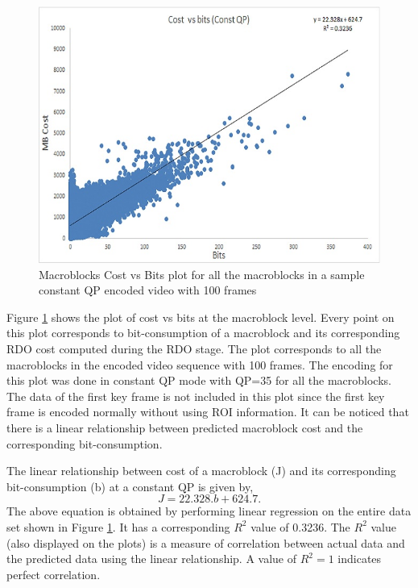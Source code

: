 \documentclass[11pt]{article} %
\begin{document}
\begin{figure}[!h]
	\centering
	\includegraphics[scale=0.75]{CostVsBits/const_QP/CostvsBits_ConstQP_Full}  
	\caption{Macroblocks Cost vs Bits plot for all the macroblocks in a sample constant QP encoded video with 100 frames}
	\label{fig:CostvsBits_ConstQP_Full}
\end{figure}

Figure \ref{fig:CostvsBits_ConstQP_Full} shows the plot of cost vs bits at the macroblock level. Every point on this plot corresponds to bit-consumption of a macroblock and its corresponding RDO cost computed during the RDO stage. The plot corresponds to all the macroblocks in the encoded video sequence with 100 frames. The encoding for this plot was done in constant QP mode with QP=35 for all the macroblocks. The data of the first key frame is not included in this plot since the first key frame is encoded normally without using ROI information. It can be noticed that there is a linear relationship between predicted macroblock cost and the corresponding bit-consumption. 

The linear relationship between cost of a macroblock (J) and its corresponding bit-consumption (b) at a constant QP is given by,
\begin{equation}
	\label{Eq:costvsbits model all}
	J = 22.328 . b + 624.7.
\end{equation}
The above equation is obtained by performing linear regression on the entire data set shown in Figure \ref{fig:CostvsBits_ConstQP_Full}. It has a corresponding $R^2$ value of 0.3236. The $R^2$ value (also displayed on the plots) is a measure of correlation between actual data and the predicted data using the linear relationship. A value of $R^2 = 1$ indicates perfect correlation. 
\end{document}
